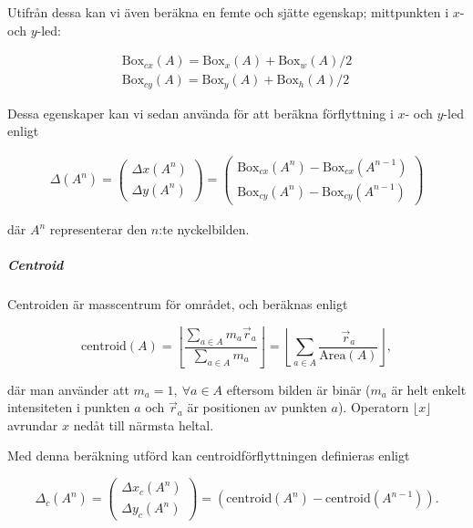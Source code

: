 \documentclass[../rapport_MVEX01-11-05]{subfiles}
\begin{document}
Utifrån dessa kan vi även beräkna en femte och sjätte egenskap;
mittpunkten i $x$- och $y$-led:

\begin{gather*}
  \textrm{Box}_{cx}(A) = \textrm{Box}_x(A) + \textrm{Box}_w(A)/2\\
  \textrm{Box}_{cy}(A) = \textrm{Box}_y(A) + \textrm{Box}_h(A)/2
\end{gather*}

Dessa egenskaper kan vi sedan använda för att beräkna förflyttning i
$x$- och $y$-led enligt

\begin{gather*}
  \Delta (A^n) =
  \begin{pmatrix}
    \Delta x(A^n)\\[3pt]
    \Delta y(A^n)
  \end{pmatrix}
  =
  \begin{pmatrix}
    \textrm{Box}_{cx}(A^n) - \textrm{Box}_{cx}(A^{n-1})\\[3pt]
    \textrm{Box}_{cy}(A^n) - \textrm{Box}_{cy}(A^{n-1})
  \end{pmatrix}
\end{gather*}

där $A^n$ representerar den $n$:te nyckelbilden.

\subparagraph{Centroid}

Centroiden är masscentrum för området, och beräknas enligt

\begin{equation*}
  \textrm{centroid}(A) = \left\lfloor\frac{
    \sum\limits_{a\in A}m_a\vec{r}_a
  }{
    \sum\limits_{a\in A}m_a
  }\right\rfloor =
  \left\lfloor\sum\limits_{a\in
  A}\frac{\vec{r}_a}{\textrm{Area}(A)}\right\rfloor,
\end{equation*}

där man använder att $m_a=1,\:\forall a\in A$ eftersom bilden är
binär ($m_a$ är helt enkelt intensiteten i punkten $a$ och
$\vec{r}_a$ är positionen av punkten $a$). Operatorn $\lfloor
x\rfloor$ avrundar $x$ nedåt till närmsta heltal.

Med denna beräkning utförd kan centroidförflyttningen definieras enligt

\begin{equation*}
  \Delta_c(A^n) = 
  \begin{pmatrix}
    \Delta x_c(A^n) \\[3pt]
    \Delta y_c(A^n)
   \end{pmatrix}
   = \left(\textrm{centroid}(A^n)-\textrm{centroid}(A^{n-1})\right).
\end{equation*}
\end{document}
